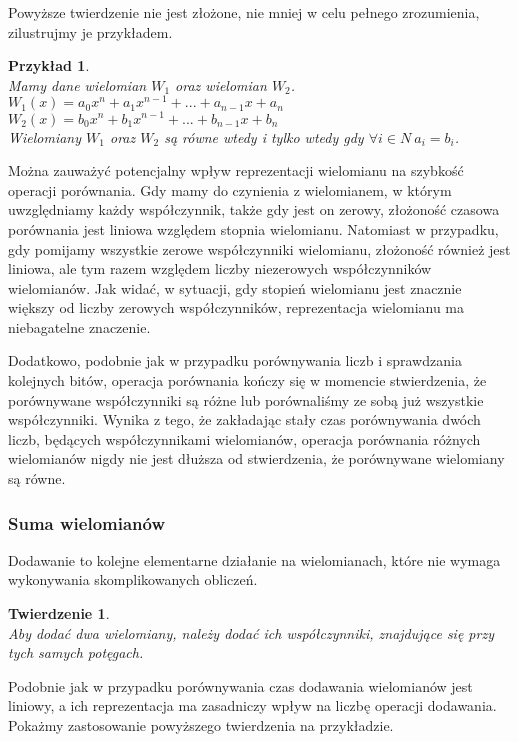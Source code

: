 \documentclass[oneside,a4paper]{book}
\newtheorem{theorem}{Twierdzenie}
\newtheorem{example}{Przykład}
\begin{document}
	Powyższe twierdzenie nie jest złożone, nie mniej w celu pełnego zrozumienia, zilustrujmy je przykładem. 
	
	\begin{example}
		$ $\\
		Mamy dane wielomian $W_1$ oraz wielomian $W_2$. \\
		$W_1(x) = a_0x^n + a_1x^{n-1} + ... + a_{n-1}x + a_n$ \\
		$W_2(x) = b_0x^n + b_1x^{n-1} + ... + b_{n-1}x + b_n$ \\
		Wielomiany $W_1$ oraz $W_2 $ są równe wtedy i tylko wtedy gdy
		$\forall{i\in N}\ a_i = b_i$.
	\end{example}
	
	Można zauważyć potencjalny wpływ reprezentacji wielomianu na szybkość operacji porównania. Gdy mamy do czynienia z wielomianem, w którym uwzględniamy każdy współczynnik, także gdy jest on zerowy, złożoność czasowa porównania jest liniowa względem stopnia wielomianu. Natomiast w przypadku, gdy pomijamy wszystkie zerowe współczynniki wielomianu, złożoność również jest liniowa, ale tym razem względem liczby niezerowych współczynników wielomianów. Jak widać, w sytuacji, gdy stopień wielomianu jest znacznie większy od liczby zerowych współczynników, reprezentacja wielomianu ma niebagatelne znaczenie.
	
	Dodatkowo, podobnie jak w przypadku porównywania liczb i sprawdzania kolejnych bitów, operacja porównania kończy się w momencie stwierdzenia, że porównywane współczynniki są różne lub porównaliśmy ze sobą już wszystkie współczynniki. Wynika z tego, że zakładając stały czas porównywania dwóch liczb, będących współczynnikami wielomianów, operacja porównania różnych wielomianów nigdy nie jest dłuższa od stwierdzenia, że porównywane wielomiany są równe.
	
	\subsubsection{Suma wielomianów}
	
	Dodawanie to kolejne elementarne działanie na wielomianach, które nie wymaga wykonywania skomplikowanych obliczeń.
	
	\begin{theorem}
		$ $\\
		Aby dodać dwa wielomiany, należy dodać ich współczynniki, znajdujące się przy tych samych potęgach.
	\end{theorem}
	
	Podobnie jak w przypadku porównywania czas dodawania wielomianów jest liniowy, a ich reprezentacja ma zasadniczy wpływ na liczbę operacji dodawania. Pokażmy zastosowanie powyższego twierdzenia na przykładzie.
	
\end{document}

